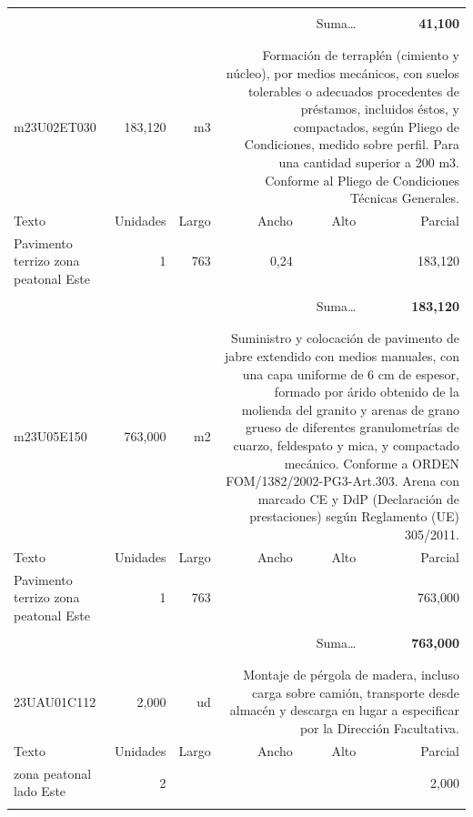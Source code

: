 \documentclass{book}%
\begin{document}
\begin{longtable}{lrrrrr}
&&&&&\\%
\multicolumn{5}{r}{Suma\ldots}&\textbf{    41,100}\\%
\hline%
&&&&&\\%
&&&&&\\%
m23U02ET030&   183,120& m3&\multicolumn{3}{p{6cm}}{\scriptsize Formación de terraplén (cimiento y núcleo), por medios mecánicos, con suelos tolerables o adecuados procedentes de préstamos, incluidos éstos, y compactados, según Pliego de Condiciones, medido sobre perfil. Para una cantidad superior a 200 m3. Conforme al Pliego de Condiciones Técnicas Generales.\normalsize}\\%
Texto&Unidades&Largo&Ancho&Alto&Parcial\\%
\hline%
\multicolumn{1}{p{3.5cm}}{Pavimento terrizo zona peatonal Este}&1&763&0,24&&   183,120\\%
&&&&&\\%
\multicolumn{5}{r}{Suma\ldots}&\textbf{   183,120}\\%
\hline%
&&&&&\\%
&&&&&\\%
m23U05E150&   763,000& m2&\multicolumn{3}{p{6cm}}{\scriptsize Suministro y colocación de pavimento de jabre extendido con medios manuales, con una capa uniforme de 6 cm de espesor, formado por árido obtenido de la molienda del granito y arenas de grano grueso de diferentes granulometrías de cuarzo, feldespato y mica, y compactado mecánico. Conforme a ORDEN FOM/1382/2002-PG3-Art.303. Arena con marcado CE y DdP (Declaración de prestaciones) según Reglamento (UE) 305/2011.\normalsize}\\%
Texto&Unidades&Largo&Ancho&Alto&Parcial\\%
\hline%
\multicolumn{1}{p{3.5cm}}{Pavimento terrizo zona peatonal Este}&1&763&&&   763,000\\%
&&&&&\\%
\multicolumn{5}{r}{Suma\ldots}&\textbf{   763,000}\\%
\hline%
&&&&&\\%
&&&&&\\%
23UAU01C112&     2,000& ud&\multicolumn{3}{p{6cm}}{\scriptsize Montaje de pérgola de madera, incluso carga sobre camión, transporte desde almacén y descarga en lugar a especificar por la Dirección Facultativa.\normalsize}\\%
Texto&Unidades&Largo&Ancho&Alto&Parcial\\%
\hline%
\multicolumn{1}{p{3.5cm}}{ zona peatonal lado Este}&2&&&&     2,000\\%
&&&&&\\%

\end{longtable}
\end{document}

